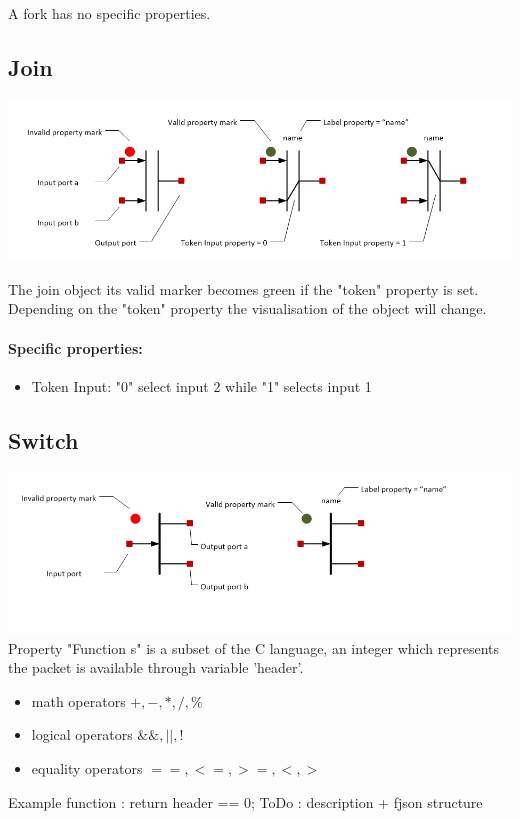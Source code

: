 \documentclass[a4paper,11pt,final]{article}
\begin{document}
A fork has no specific properties.

\subsection{Join}
\includegraphics[width=1.0\textwidth]{join}

The join object its valid marker becomes green if the "token" property is set. Depending on the "token" property the visualisation of the object will change.
\paragraph{Specific properties:}
\begin{itemize}
\item Token Input: "0" select input 2 while "1" selects input 1
\end{itemize}



\subsection{Switch}
\includegraphics[width=1.0\textwidth]{switch}
Property "Function s" is a subset of the C language, an integer which represents the packet is available through variable 'header'.
\begin{itemize}
\item math operators $+,-,*,/,\%$
\item logical operators $\&\&,||,!$
\item equality operators $==,<=,>=,<,>$
\end{itemize}
Example function : return header == 0;
ToDo : description + fjson structure
\end{document}
